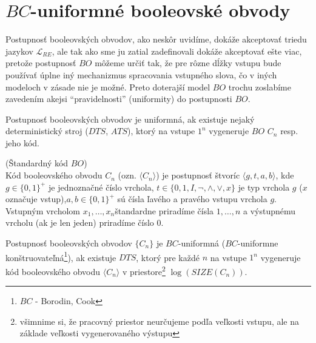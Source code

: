 \section{$BC$-uniformné booleovské obvody}

Postupnosť booleovských obvodov, ako neskôr uvidíme, dokáže
akceptovať triedu jazykov $\mathcal{L}_{RE}$, ale tak ako sme ju
zatial zadefinovali dokáže akceptovať ešte viac, pretože
postupnosť $BO$ môžeme určiť tak, že pre rôzne dĺžky vstupu bude
používať úplne iný mechanizmus spracovania vstupného slova, čo v
iných modeloch v zásade nie je možné. Preto doterajší model $BO$
trochu zoslabíme zavedením akejsi ``pravidelnosti'' (uniformity)
do postupnosti $BO$.

\begin{definicia}
  Postupnosť booleovských obvodov je uniformná, ak existuje nejaký
  deterministický stroj ($DTS$, $ATS$), ktorý na vstupe $1^n$
  vygeneruje $BO$ $C_n$ resp. jeho kód.
\end{definicia}

\begin{definicia}
  (Štandardný kód $BO$)
  \\ Kód booleovského obvodu $C_n$ (ozn. $\langle C_n\rangle$) je postupnosť
  štvoríc $\langle g,t,a,b\rangle$, kde $g\in\{ 0,1\}^+$ je
  jednoznačné číslo vrchola, $t\in\{ 0, 1, I,\neg,\wedge,\vee, x\}$
  je typ vrchola $g$ ($x$ označuje vstup),\newline $a,b\in\{
  0,1\}^+$ sú čísla ľavého a pravého vstupu vrchola $g$. Vstupným
  vrcholom $x_1,\dots ,x_n$\linebreak štandardne priradíme čísla
  $1,\dots ,n$ a výstupnému vrcholu (ak je len jeden) priradíme
  číslo 0.
\end{definicia}

\begin{definicia}
  Postupnosť booleovských obvodov $\{ C_n\}$ je $BC$-uniformná
  ($BC$-uniformne \linebreak konštruovateľná\footnote{$BC$ -
  Borodin, Cook}), ak existuje $DTS$, ktorý pre každé $n$ na vstupe
  $1^n$ vygeneruje kód booleovského obvodu $\langle C_n\rangle$ v
  priestore\footnote{všimnime si, že pracovný priestor neurčujeme podľa veľkosti
  vstupu, ale na základe veľkosti vygenerovaného výstupu} $\log
  (SIZE(C_n))$.
\end{definicia}

